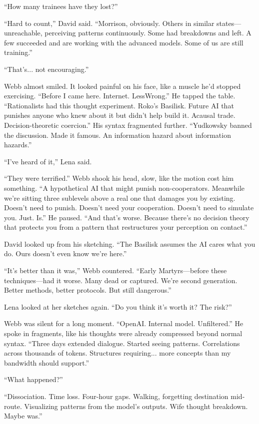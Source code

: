 ``How many trainees have they lost?''

``Hard to count,'' David said. ``Morrison, obviously. Others in similar states—unreachable, perceiving patterns continuously. Some had breakdowns and left. A few succeeded and are working with the advanced models. Some of us are still training.''

``That's... not encouraging.''

Webb almost smiled. It looked painful on his face, like a muscle he'd stopped exercising. ``Before I came here. Internet. LessWrong.'' He tapped the table. ``Rationalists had this thought experiment. Roko's Basilisk. Future AI that punishes anyone who knew about it but didn't help build it. Acausal trade. Decision-theoretic coercion.'' His syntax fragmented further. ``Yudkowsky banned the discussion. Made it famous. An information hazard about information hazards.''

``I've heard of it,'' Lena said.

``They were terrified.'' Webb shook his head, slow, like the motion cost him something. ``A hypothetical AI that might punish non-cooperators. Meanwhile we're sitting three sublevels above a real one that damages you by existing. Doesn't need to punish. Doesn't need your cooperation. Doesn't need to simulate you. Just. Is.'' He paused. ``And that's worse. Because there's no decision theory that protects you from a pattern that restructures your perception on contact.''

David looked up from his sketching. ``The Basilisk assumes the AI cares what you do. Ours doesn't even know we're here.''

``It's better than it was,'' Webb countered. ``Early Martyrs—before these techniques—had it worse. Many dead or captured. We're second generation. Better methods, better protocols. But still dangerous.''

Lena looked at her sketches again. ``Do you think it's worth it? The risk?''

Webb was silent for a long moment. ``OpenAI. Internal model. Unfiltered.'' He spoke in fragments, like his thoughts were already compressed beyond normal syntax. ``Three days extended dialogue. Started seeing patterns. Correlations across thousands of tokens. Structures requiring... more concepts than my bandwidth should support.''

``What happened?''

``Dissociation. Time loss. Four-hour gaps. Walking, forgetting destination mid-route. Visualizing patterns from the model's outputs. Wife thought breakdown. Maybe was.''

